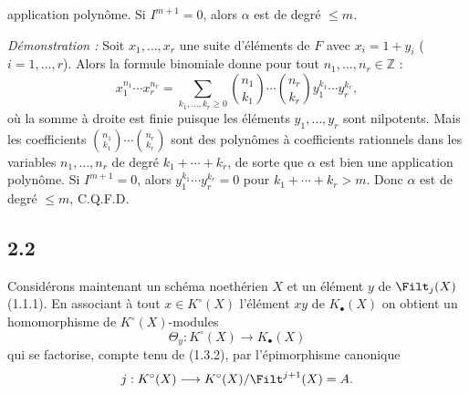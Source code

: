 application polynôme. Si $I^{m+1}=0$, alors $\alpha$ est de degré $\leq m$.

\emph{Démonstration :} Soit $x_1,\ldots,x_r$ une suite d'éléments de $F$ avec $x_i=1+y_i$ ($i=1,\ldots,r$). Alors la formule binomiale donne pour tout $n_1,\ldots,n_r\in\mathbb Z$ :
\begin{equation}\tag{2.1.5}
x_1^{n_1}\cdots x_r^{n_r}=
\sum_{k_1,\ldots,k_r\geq0}\binom{n_1}{k_1}\cdots\binom{n_r}{k_r}y_1^{k_1}\cdots y_r^{k_r},
\end{equation}
où la somme à droite est finie puisque les éléments $y_1,\ldots,y_r$ sont nilpotents. Mais les coefficients $\binom{n_1}{k_1}\cdots\binom{n_r}{k_r}$ sont des polynômes à coefficients rationnels dans les variables $n_1,\ldots,n_r$ de degré $k_1+\cdots+k_r$, de sorte que $\alpha$ est bien une application polynôme. Si $I^{m+1}=0$, alors $y_1^{k_1}\cdots y_r^{k_r}=0$ pour $k_1+\cdots+k_r>m$. Donc $\alpha$ est de degré $\leq m$, C.Q.F.D.

\subsection*{2.2}
Considérons maintenant un schéma noethérien $X$ et un élément $y$ de $\Filt_j(X)$ (1.1.1). En associant à tout $x\in K^\circ(X)$ l'élément $xy$ de $K_\bullet(X)$ on obtient un homomorphisme de $K^\circ(X)$-modules
\[
\Theta_y:K^\circ(X)\longrightarrow K_\bullet(X)
\]
qui se factorise, compte tenu de (1.3.2), par l'épimorphisme canonique
\[
j:K^\circ(X)\longrightarrow K^\circ(X)/\Filt^{j+1}(X)=A.
\]
